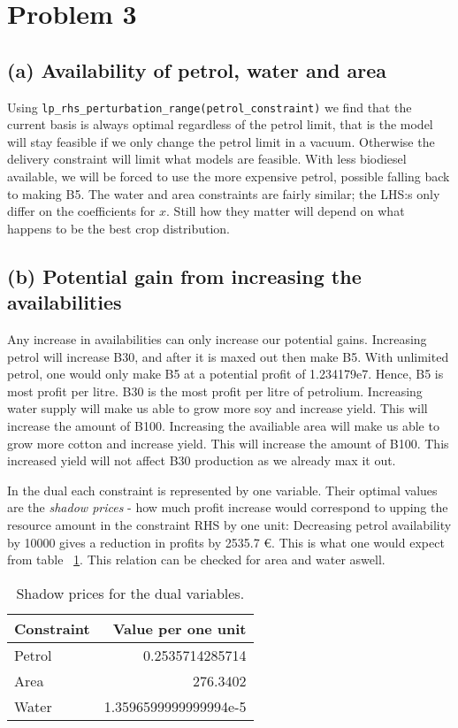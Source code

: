 \documentclass{article}
\begin{document}
\section{Problem 3}
\subsection{(a) Availability of petrol, water and area}
Using \verb+lp_rhs_perturbation_range(petrol_constraint)+ we find that
the current basis is always optimal regardless of the petrol limit,
that is the model will stay feasible if we only change
the petrol limit in a vacuum.
Otherwise the delivery constraint will limit what models are feasible.
With less biodiesel available,
we will be forced to use the more expensive petrol,
possible falling back to making B5.
The water and area constraints are fairly similar;
the LHS:s only differ on the coefficients for $x$.
Still how they matter will depend on what happens to be
the best crop distribution.

\subsection{(b) Potential gain from increasing the availabilities}
Any increase in availabilities can only increase our potential gains.
Increasing petrol will increase B30, and after it is maxed out then make B5.
With unlimited petrol, one would only make B5 at a potential profit of 1.234179e7.
Hence, B5 is most profit per litre.
B30 is the most profit per litre of petrolium.
Increasing water supply will make us able to grow more soy and increase yield.
This will increase the amount of B100.
Increasing the availiable area will make us able to grow more cotton and increase yield.
This will increase the amount of B100.
This increased yield will not affect B30 production as we already max it out.

In the dual each constraint is represented by one variable.
Their optimal values are the \emph{shadow prices} -
how much profit increase would correspond to upping the resource amount
in the constraint RHS by one unit:
Decreasing petrol availability by \num{10000} gives a reduction in profits by \num{2535.7} \euro. 
This is what one would expect from table ~\ref{tab:shadowprices}.
This relation can be checked for area and water aswell. 

\begin{table}
	\centering
	\caption{Shadow prices for the dual variables. \label{tab:shadowprices}}
	\begin{tabular}{l r}
		\toprule
		Constraint & Value per one unit \\
		\midrule
		Petrol & 0.2535714285714 \\
		Area & 276.3402 \\
		Water & 1.3596599999999994e-5 \\
		\bottomrule
	\end{tabular}
\end{table}
\end{document}
